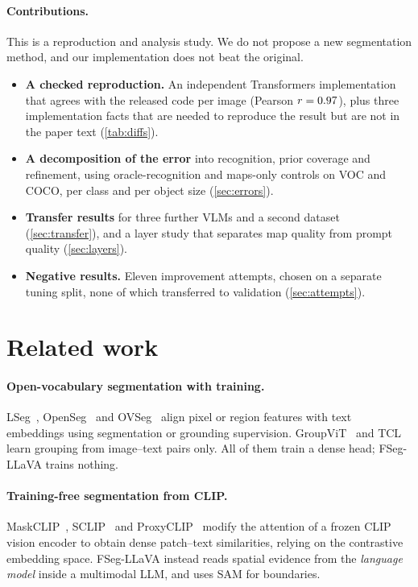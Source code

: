 \documentclass{article}
\newcommand{\method}{FSeg-LLaVA}
\begin{document}
\paragraph{Contributions.} This is a reproduction and analysis study. We do not propose a new
segmentation method, and our implementation does not beat the original.
\begin{itemize}[leftmargin=1.2em]
  \item \textbf{A checked reproduction.} An independent Transformers implementation that agrees with
        the released code per image (Pearson $r=0.97$), plus three implementation facts that are
        needed to reproduce the result but are not in the paper text (\cref{tab:diffs}).
  \item \textbf{A decomposition of the error} into recognition, prior coverage and refinement, using
        oracle-recognition and maps-only controls on VOC and COCO, per class and per object size
        (\cref{sec:errors}).
  \item \textbf{Transfer results} for three further VLMs and a second dataset (\cref{sec:transfer}),
        and a layer study that separates map quality from prompt quality (\cref{sec:layers}).
  \item \textbf{Negative results.} Eleven improvement attempts, chosen on a separate tuning split,
        none of which transferred to validation (\cref{sec:attempts}).
\end{itemize}

\section{Related work}
\label{sec:related}
\paragraph{Open-vocabulary segmentation with training.} LSeg~\citep{li2022lseg},
OpenSeg~\citep{ghiasi2022openseg} and OVSeg~\citep{liang2023ovseg} align pixel or region features with
text embeddings using segmentation or grounding supervision. GroupViT~\citep{xu2022groupvit} and
TCL~\citep{cha2023tcl} learn grouping from image--text pairs only. All of them train a dense head;
\method{} trains nothing.

\paragraph{Training-free segmentation from CLIP.} MaskCLIP~\citep{zhou2022maskclip},
SCLIP~\citep{wang2024sclip} and ProxyCLIP~\citep{lan2024proxyclip} modify the attention of a frozen
CLIP~\citep{radford2021clip} vision encoder to obtain dense patch--text similarities, relying on the
contrastive embedding space. \method{} instead reads spatial evidence from the \emph{language model}
inside a multimodal LLM, and uses SAM for boundaries.
\end{document}
